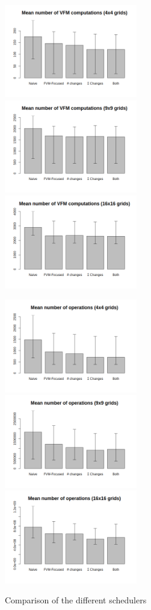 \documentclass[a4paper,11pt]{report}
\begin{document}
\begin{figure}[!ht]
    \includegraphics[width=5.8cm]{../Test/results/sched_2_vfm.png}%
    \includegraphics[width=5.8cm]{../Test/results/sched_3_vfm.png}%
    \includegraphics[width=5.8cm]{../Test/results/sched_4_vfm.png}
    
    \includegraphics[width=5.8cm]{../Test/results/sched_2_op.png}%
    \includegraphics[width=5.8cm]{../Test/results/sched_3_op.png}%
    \includegraphics[width=5.8cm]{../Test/results/sched_4_op.png}
    \caption{Comparison of the different schedulers}
    \label{fig:ressched}
\end{figure}
\end{document}
